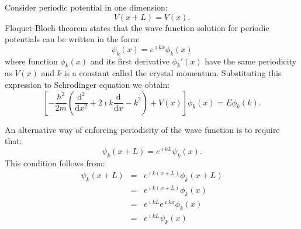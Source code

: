 Consider periodic potential in one dimension:
\begin{equation}
V(x+L)=V(x).
\end{equation}
Floquet-Bloch theorem states that the wave function solution for periodic
potentials can be written in the form:
\begin{equation}
\psi_{k}(x)=e^{\imath kx}\phi_{k}(x)
\end{equation}
where function $\phi_{k}(x)$ and its first derivative $\phi_{k}'(x)$
have the same periodicity as $V(x)$ and $k$ is a constant called
the crystal momentum. Substituting this expression to Schrodinger
equation we obtain:
\begin{equation}
\left[-\frac{\hbar^{2}}{2m}\left(\frac{\mathrm{d}^{2}}{\mathrm{d}x^{2}}+2\imath k\frac{\mathrm{d}}{\mathrm{d}x}-k^{2}\right)+V(x)\right]\phi_{k}(x)=E\phi_{k}(k).
\end{equation}


An alternative way of enforcing periodicity of the wave function is
to require that:
\begin{equation}
\psi_{k}(x+L)=e^{\imath kL}\psi_{k}(x).
\end{equation}
This condition follows from:
\begin{eqnarray*}
\psi_{k}(x+L) & = & e^{\imath k(x+L)}\phi_{k}(x+L)\\
 & = & e^{\imath k(x+L)}\phi_{k}(x)\\
 & = & e^{\imath kL}e^{\imath kx}\phi_{k}(x)\\
 & = & e^{\imath kL}\psi_{k}(x)
\end{eqnarray*}


